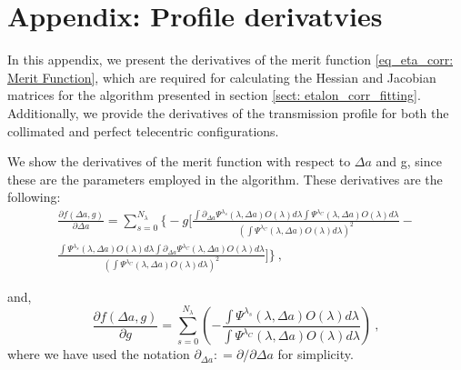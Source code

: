\documentclass[12pt]{mythesis}
\begin{document}
\tableofcontents
\listoffigures

\mainmatter %













\appendix

\chapter*{Appendix: Profile derivatvies}
In this appendix, we present the derivatives of the merit function \eqref{eq_eta_corr: Merit Function}, which are required for calculating the Hessian and Jacobian matrices for the algorithm presented in section \ref{sect: etalon_corr_fitting}. Additionally, we provide the derivatives of the transmission profile for both the collimated and perfect telecentric configurations.

We show the derivatives of the merit function with respect to $\Delta a$ and g, since these are the parameters employed in the algorithm. These derivatives are the following:
\begin{multline}
  \frac{\partial f (\Delta a , g)} {\partial \Delta a } =\sum _ {s = 0} ^{N _ \lambda} \Biggl\{  - g \Biggl[ \frac{\int \partial _ {\Delta a} \Psi ^ {\lambda _ s}(\lambda, \Delta a) O(\lambda) d\lambda\int \Psi ^ {\lambda _ C}(\lambda, \Delta a) O(\lambda) d\lambda}{\left(\int \Psi ^ {\lambda _ C}(\lambda, \Delta a) O(\lambda) d\lambda \right) ^ 2}- \\
  \frac{\int \Psi ^ {\lambda _ s}(\lambda, \Delta a) O(\lambda) d\lambda\int \partial _ {\Delta a} \Psi ^ {\lambda _ C}(\lambda, \Delta a) O(\lambda) d\lambda}{\left(\int \Psi ^ {\lambda _ C}(\lambda, \Delta a) O(\lambda) d\lambda \right) ^ 2} \Biggr] \Biggr\} \ ,
\end{multline}

and,
\begin{equation}
   \frac{\partial f (\Delta a , g)} {\partial g } = \sum _ {s = 0} ^{N _ \lambda} \left( - \frac{\int\Psi ^ {\lambda _ s}(\lambda, \Delta a) O(\lambda) d\lambda}{\int \Psi ^ {\lambda _ C}(\lambda, \Delta a) O(\lambda) d\lambda}  \right) \ , 
\end{equation}
where we have used the notation $\partial _ {\Delta a} : = \partial / \partial \Delta a$ for simplicity. 
\end{document}
